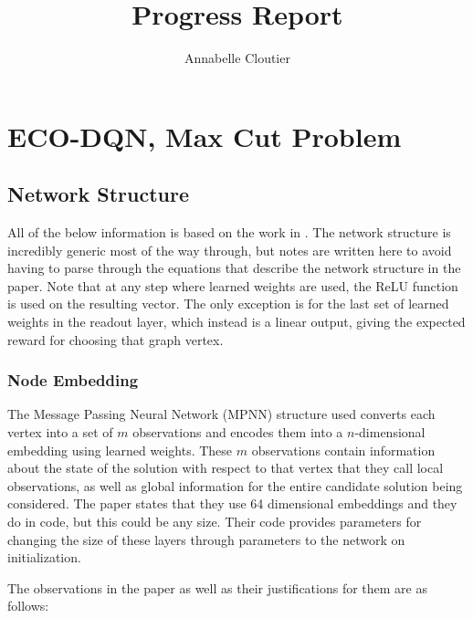 \documentclass{article}
\title{Progress Report}
\author{Annabelle Cloutier}
\begin{document}
\maketitle

\tableofcontents

\section{ECO-DQN, Max Cut Problem}\label{sec:eco-dqn-explained}

\subsection{Network Structure}\label{sec:network-structure}

All of the below information is based on the work in \cite{eco-dqn}.
The network structure is incredibly generic most of the way through, but notes are written here to avoid having to parse through the equations that describe the network structure in the paper. Note that at any step where learned weights are used, the ReLU function is used on the resulting vector. The only exception is for the last set of learned weights in the readout layer, which instead is a linear output, giving the expected reward for choosing that graph vertex. 

\subsubsection{Node Embedding}\label{sec:node-embedding}

The Message Passing Neural Network (MPNN) structure used converts each vertex into a set of $m$ observations and encodes them into a $n$-dimensional embedding using learned weights. These $m$ observations contain information about the state of the solution with respect to that vertex that they call local observations, as well as global information for the entire candidate solution being considered. The paper states that they use 64 dimensional embeddings and they do in code, but this could be any size. Their code provides parameters for changing the size of these layers through parameters to the network on initialization.

The observations in the paper as well as their justifications for them are as follows: 
\end{document}

